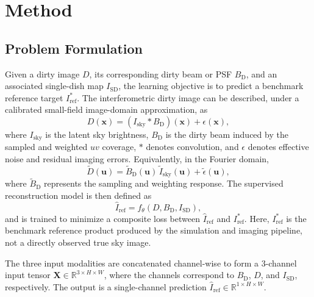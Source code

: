 \documentclass[twocolumn]{aastex631}
\begin{document}
\section{Method}
\label{sec:method}

\subsection{Problem Formulation}

Given a dirty image $D$, its corresponding dirty beam or PSF $B_{\mathrm{D}}$, and an associated single-dish map $I_{\mathrm{SD}}$, the learning objective is to predict a benchmark reference target $I_{\mathrm{ref}}^*$.
The interferometric dirty image can be described, under a calibrated small-field image-domain approximation, as
\begin{equation}
	D(\mathbf{x}) = \left(I_{\mathrm{sky}} \ast B_{\mathrm{D}}\right)(\mathbf{x}) + \epsilon(\mathbf{x}),
	\label{eq:measurement}
\end{equation}
where $I_{\mathrm{sky}}$ is the latent sky brightness, $B_{\mathrm{D}}$ is the dirty beam induced by the sampled and weighted $uv$ coverage, $\ast$ denotes convolution, and $\epsilon$ denotes effective noise and residual imaging errors.
Equivalently, in the Fourier domain,
\begin{equation}
	\tilde{D}(\mathbf{u}) = \tilde{B}_{\mathrm{D}}(\mathbf{u})\,\tilde{I}_{\mathrm{sky}}(\mathbf{u}) + \tilde{\epsilon}(\mathbf{u}),
	\label{eq:measurement_fourier}
\end{equation}
where $\tilde{B}_{\mathrm{D}}$ represents the sampling and weighting response.
The supervised reconstruction model is then defined as
\begin{equation}
	\hat{I}_{\mathrm{ref}} = f_\theta(D, B_{\mathrm{D}}, I_{\mathrm{SD}}),
\end{equation}
and is trained to minimize a composite loss between $\hat{I}_{\mathrm{ref}}$ and $I_{\mathrm{ref}}^*$.
Here, $I_{\mathrm{ref}}^*$ is the benchmark reference product produced by the simulation and imaging pipeline, not a directly observed true sky image.

The three input modalities are concatenated channel-wise to form a 3-channel input tensor $\mathbf{X} \in \mathbb{R}^{3 \times H \times W}$, where the channels correspond to $B_{\mathrm{D}}$, $D$, and $I_{\mathrm{SD}}$, respectively.
The output is a single-channel prediction $\hat{I}_{\mathrm{ref}} \in \mathbb{R}^{1 \times H \times W}$.
\end{document}
